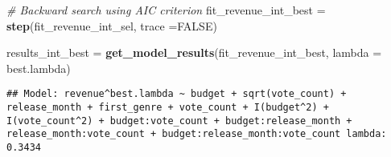 \documentclass[
]{article}
\newenvironment{Shaded}{\begin{snugshade}}{\end{snugshade}}
\newcommand{\CommentTok}[1]{\textcolor[rgb]{0.56,0.35,0.01}{\textit{#1}}}
\newcommand{\DataTypeTok}[1]{\textcolor[rgb]{0.13,0.29,0.53}{#1}}
\newcommand{\KeywordTok}[1]{\textcolor[rgb]{0.13,0.29,0.53}{\textbf{#1}}}
\newcommand{\NormalTok}[1]{#1}
\newcommand{\OperatorTok}[1]{\textcolor[rgb]{0.81,0.36,0.00}{\textbf{#1}}}
\newcommand{\OtherTok}[1]{\textcolor[rgb]{0.56,0.35,0.01}{#1}}
\newcommand{\StringTok}[1]{\textcolor[rgb]{0.31,0.60,0.02}{#1}}
\begin{document}
\begin{Shaded}
\end{Shaded}

\begin{Shaded}
\begin{Highlighting}[]
\CommentTok{# Backward search using AIC criterion}
\NormalTok{fit_revenue_int_best =}\StringTok{ }\KeywordTok{step}\NormalTok{(fit_revenue_int_sel, }\DataTypeTok{trace =}\OtherTok{FALSE}\NormalTok{)}

\NormalTok{results_int_best =}\StringTok{ }\KeywordTok{get_model_results}\NormalTok{(fit_revenue_int_best, }\DataTypeTok{lambda =}\NormalTok{ best.lambda)}
\end{Highlighting}
\end{Shaded}

\begin{verbatim}
## Model: revenue^best.lambda ~ budget + sqrt(vote_count) + release_month + first_genre + vote_count + I(budget^2) + I(vote_count^2) + budget:vote_count + budget:release_month + release_month:vote_count + budget:release_month:vote_count lambda: 0.3434
\end{verbatim}
\end{document}
